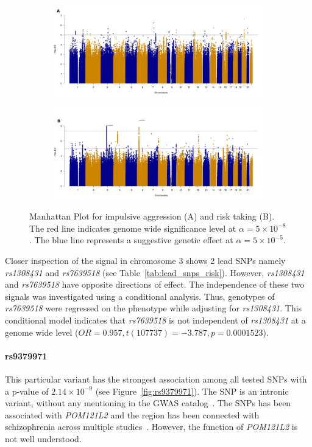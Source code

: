 \begin{figure}[!htpb]
  \begin{subfigure}{1\textwidth}
  \centering
  \includegraphics[width=0.8\linewidth]{ukb_assoc/figure/manhatten_plots/agg_manhatten_color_2_A.jpeg}
  \end{subfigure}
  \begin{subfigure}{1\textwidth}
  \centering
  \includegraphics[width=0.8\linewidth]{ukb_assoc/figure/manhatten_plots/risk_manhatten_color_B.jpeg}
  \end{subfigure}
  \caption{
    Manhattan Plot for impulsive aggression (A) and risk taking (B).
    The red line indicates genome wide significance level at $\alpha=5\times10^{-8}$.
    The blue line represents a suggestive genetic effect at $\alpha=5\times10^{-5}$.}
\end{figure}

Closer inspection of the signal in chromosome 3 shows 2 lead SNPs namely \textit{rs1308431} and \textit{rs7639518} (see Table~\ref{tab:lead_snps_risk}).
However, \textit{rs1308431} and \textit{rs7639518} have opposite directions of effect.
The independence of these two signals was investigated using a conditional analysis.
Thus, genotypes of \textit{rs7639518} were regressed on the phenotype while adjusting for \textit{rs1308431}.
This conditional model indicates that \textit{rs7639518} is not independent of \textit{rs1308431} at a genome wide level ($OR=0.957, t(107737)=-3.787, p=0.0001523$).

\paragraph{rs9379971}
\label{par:rs9379971}
This particular variant has the strongest association among all tested SNPs with a p-value of $2.14\times10^{-9}$ (see Figure~\ref{fig:rs9379971}). 
The SNP is an intronic variant, without any mentioning in the GWAS catalog~\cite{Welter2014}.
The SNPs has been associated with \textit{POM121L2} and the region has been connected with schizophrenia across multiple studies~\cite{Aberg2013,Shi2009}.
However, the function of \textit{POM121L2} is not well understood.

